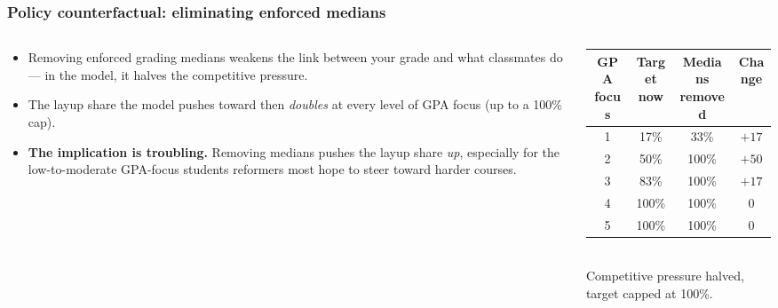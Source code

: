 \documentclass[xcolor=dvipsnames,11pt,table,aspectratio=169]{beamer}
\begin{document}
\begin{frame}
\frametitle{Policy counterfactual: eliminating enforced medians}
\begin{columns}[T]
\begin{column}{0.55\textwidth}
\small
\begin{itemize}
\itemsep3pt
\item Removing enforced grading medians weakens the link between your
      grade and what classmates do --- in the model, it halves the
      competitive pressure.
\item The layup share the model pushes toward then \emph{doubles} at
      every level of GPA focus (up to a 100\% cap).
\item \textbf{The implication is troubling.} Removing medians pushes the
      layup share \emph{up}, especially for the low-to-moderate GPA-focus
      students reformers most hope to steer toward harder courses.
\end{itemize}
\end{column}
\begin{column}{0.45\textwidth}
\centering
\footnotesize
\begin{tabular}{cccc}
\toprule
GPA focus & Target now & Medians removed & Change \\
\midrule
1 & 17\% & 33\%  & $+17$ \\
2 & 50\% & 100\% & $+50$ \\
3 & 83\% & 100\% & $+17$ \\
4 & 100\% & 100\% & $0$ \\
5 & 100\% & 100\% & $0$ \\
\bottomrule
\end{tabular}\\[4pt]
\scriptsize Competitive pressure halved, target capped at 100\%.
\end{column}
\end{columns}
\end{frame}
\end{document}
